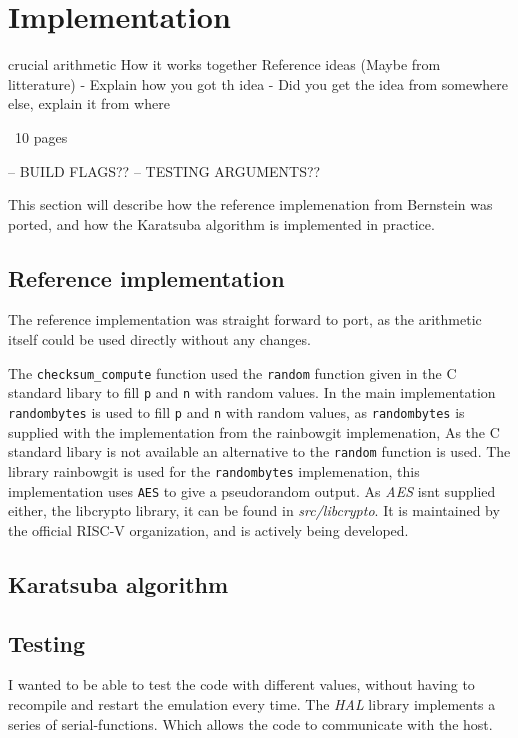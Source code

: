 \section{Implementation}
    crucial arithmetic
    How it works together
    Reference ideas (Maybe from litterature)
    - Explain how you got th idea
    - Did you get the idea from somewhere else, explain it from where

~10 pages

-- BUILD FLAGS??
-- TESTING ARGUMENTS??

This section will describe how the reference implemenation from Bernstein was ported, and how the Karatsuba algorithm is implemented in practice.
\subsection{Reference implementation}
The reference implementation was straight forward to port, as the arithmetic itself could be used directly without any changes.


The \texttt{checksum\_compute} function used the \texttt{random\(\)} function given in the C standard libary to fill \texttt{p} and \texttt{n} with random values. In the main implementation \texttt{randombytes\(\)} is used to fill \texttt{p} and \texttt{n} with random values, as \texttt{randombytes\(\)} is supplied with the implementation from the rainbowgit implemenation\cite{rainbowgit}, 
As the C standard libary is not available an alternative to the \texttt{random\(\)} function is used. The library rainbowgit\cite{rainbowgit} is used for the \texttt{randombytes\(\)} implemenation, this implementation uses \texttt{AES} to give a pseudorandom output. As \textit{AES} isnt supplied either, the libcrypto library\cite{libcrypto}, it can be found in \textit{src/libcrypto}. It is maintained by the official RISC-V organization, and is actively being developed.



\subsection{Karatsuba algorithm}


\subsection{Testing}
I wanted to be able to test the code with different values, without having to recompile and restart the emulation every time. The \textit{HAL} library implements a series of serial-functions. Which allows the code to communicate with the host.
